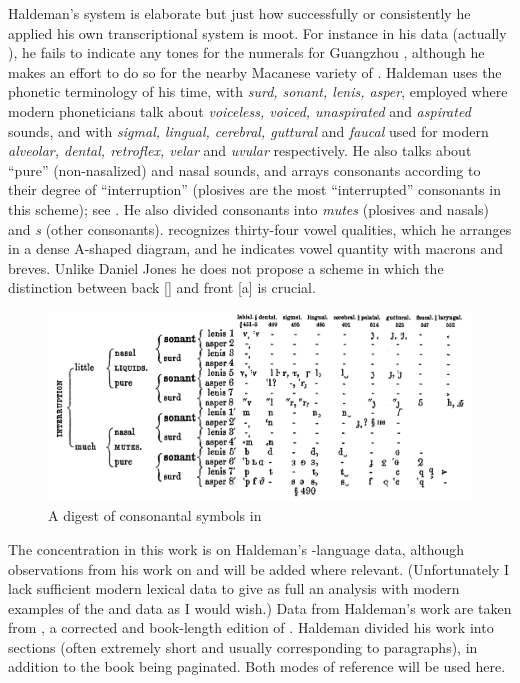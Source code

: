 \documentclass[output=paper]{LSP/langsci}
\begin{document}
Haldeman's system is elaborate but just how successfully or consistently he applied his own transcriptional system is moot. For instance in his  data (actually ), he fails to indicate any tones for the numerals for Guangzhou , although he makes an effort to do so for  the nearby Macanese variety of .  Haldeman uses the phonetic terminology of his time, with \textit{surd, sonant, lenis, asper}, employed where modern phoneticians talk about \textit{voiceless, voiced, unaspirated} and \textit{aspirated} sounds, and with \textit{sigmal, lingual, cerebral, guttural} and \textit{faucal} used for modern \textit{alveolar, dental, retroflex, velar} and \textit{uvular} respectively. He also talks about ``pure'' (non-nasalized) and  nasal  sounds, and arrays consonants according to their degree of ``interruption'' (plosives are the most ``interrupted'' consonants in this scheme); see . He also divided consonants into \textit{mutes} (plosives and nasals) and \textit{s} (other consonants).  \citet[83, 369]{Haldeman1860} recognizes thirty-four vowel qualities, which he arranges in a dense A-shaped diagram, and he indicates vowel quantity with macrons and breves. Unlike Daniel Jones \citeyearpar{Jones1909} he does not propose a scheme in which the distinction between back [] and front [a] is crucial.  

\begin{figure} 
\caption{A digest of consonantal symbols in \citealt[121: \S576]{Haldeman1860}} \label{haldemandigest}

\includegraphics[width=\textwidth]{figures/Grant-consonants2.png}
\end{figure}

The concentration in this work is on Haldeman's -language data, although  observations from his work on  and  will be added where relevant. (Unfortunately I lack sufficient modern lexical data to give as full an analysis with modern examples of the  and  data as I would wish.)   Data from Haldeman's work are taken from \citet{Haldeman1860}, a corrected and book-length edition of \citet{Haldeman1859}.  Haldeman divided his work into sections (often extremely short and usually corresponding to paragraphs), in addition to the book being paginated.  Both modes of reference will be used here.  
\end{document}
